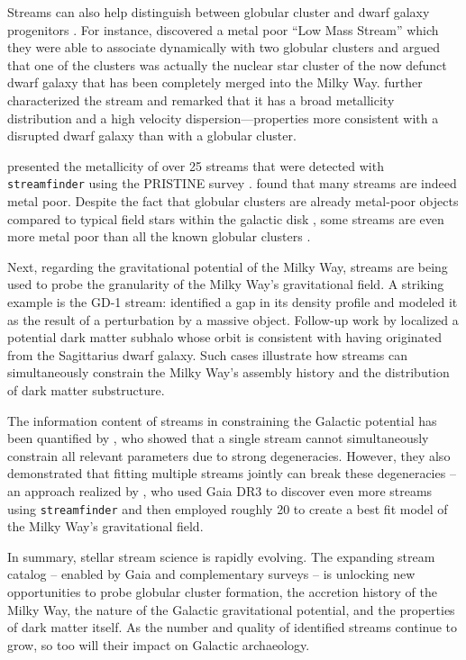     Streams can also help distinguish between globular cluster and dwarf galaxy progenitors \citep{2021ApJ...909L..26B}. For instance, \citet{2020ApJ...898L..37Y} discovered a metal poor ``Low Mass Stream''  which they were able to associate dynamically with two globular clusters and argued that one of the clusters was actually the nuclear star cluster of the now defunct dwarf galaxy that has been completely merged into the Milky Way. \citet{2021ApJ...920...51M} further characterized the stream and remarked that it has a broad metallicity distribution and a high velocity dispersion—properties more consistent with a disrupted dwarf galaxy than with a globular cluster. 
    
    \citet{2022MNRAS.516.5331M} presented the metallicity of over 25 streams that were detected with \texttt{streamfinder} using the PRISTINE survey \citep{2017MNRAS.471.2587S}. \citet{2022MNRAS.516.5331M} found that many streams are indeed metal poor. Despite the fact that globular clusters are already metal-poor objects compared to typical field stars within the galactic disk \citep{2006ARA&A..44..193B}, some streams are even more metal poor than all the known globular clusters \citep{2020Natur.583..768W,2022MNRAS.516.5331M,2025A&A...698A..82Y}.
    
    Next, regarding the gravitational potential of the Milky Way, streams are being used to probe the granularity of the Milky Way's gravitational field. A striking example is the GD-1 stream: \citet{2019ApJ...880...38B} identified a gap in its density profile and modeled it as the result of a perturbation by a massive object. Follow-up work by \citet{2020ApJ...892L..37B} localized a potential dark matter subhalo whose orbit is consistent with having originated from the Sagittarius dwarf galaxy. Such cases illustrate how streams can simultaneously constrain the Milky Way's assembly history and the distribution of dark matter substructure.

    The information content of streams in constraining the Galactic potential has been quantified by \citet{2018ApJ...867..101B}, who showed that a single stream cannot simultaneously constrain all relevant parameters due to strong degeneracies. However, they also demonstrated that fitting multiple streams jointly can break these degeneracies -- an approach realized by \citet{2024ApJ...967...89I}, who used Gaia DR3 to discover even more streams using \texttt{streamfinder} and then employed roughly 20 to create a best fit model of the Milky Way's gravitational field.

    In summary, stellar stream science is rapidly evolving. The expanding stream catalog -- enabled by Gaia and complementary surveys -- is unlocking new opportunities to probe globular cluster formation, the accretion history of the Milky Way, the nature of the Galactic gravitational potential, and the properties of dark matter itself. As the number and quality of identified streams continue to grow, so too will their impact on Galactic archaeology.
